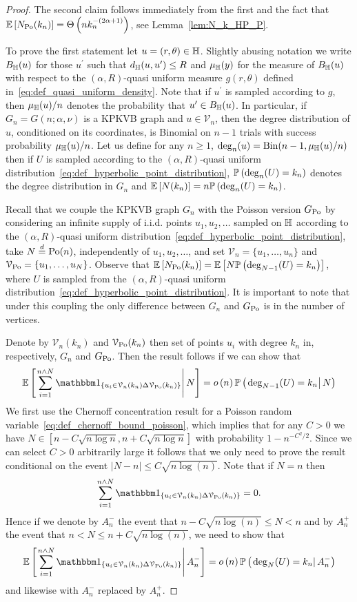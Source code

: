 \begin{proof}
The second claim follows immediately from the first and the fact that $\mathbb{E}\left[N_{{\mathrm{Po}}}(k_n)\right] = \Theta\left(n k_n^{-(2\alpha + 1)}\right)$, see Lemma~\ref{lem:N_k_HP_P}.

To prove the first statement let $u = (r,\theta) \in \mathbb{H}$. Slightly abusing notation we write $B_{\mathbb{H}}(u)$ for those $u^\prime$ such that $d_{\mathbb{H}}(u,u^\prime) \le R$ and $\mu_{\mathbb{H}}(y)$ for the measure of $B_{\mathbb{H}}(u)$ with respect to the $(\alpha, R)$-quasi uniform measure $g(r,\theta)$ defined in~\eqref{eq:def_quasi_uniform_density}. Note that if $u^\prime$ is sampled according to $g$, then $\mu_{\mathbb{H}}(u)/n$ denotes the probability that $u^\prime \in B_{\mathbb{H}}(u)$. In particular, if $G_n = G(n; \alpha, \nu)$ is a KPKVB graph and $u \in \mathcal{V}_n$, then the degree distribution of $u$, conditioned on its coordinates, is Binomial on $n-1$ trials with success probability $\mu_{\mathbb{H}}(u)/n$. Let us define for any $n \ge 1$, $\mathrm{deg}_n(u) = \mathrm{Bin}(n-1, \mu_{\mathbb{H}}(u)/n)$ then if $U$ is sampled according to the  $(\alpha, R)$-quasi uniform distribution~\eqref{eq:def_hyperbolic_point_distribution}, $\mathbb{P}\left(\mathrm{deg}_n(U) = k_n\right)$ denotes the degree distribution in $G_n$ and $\mathbb{E}\left[N(k_n)\right] = n \mathbb{P}\left(\mathrm{deg}_n(U) = k_n\right)$. 

Recall that we couple the KPKVB graph $G_n$ with the Poisson version $G_{\text{Po}}$ by considering an infinite supply of i.i.d. points $u_1, u_2, \dots$ sampled on $\mathbb{H}$ according to the $(\alpha, R)$-quasi uniform distribution~\eqref{eq:def_hyperbolic_point_distribution}, take $N \stackrel{d}{=} {\mathrm{Po}}(n)$, independently of $u_1, u_2, \dots$, and set $\mathcal{V}_n =\{u_1, \dots, u_n\}$ and $\mathcal{V}_{{\mathrm{Po}}} = \{u_1, \dots, u_N\}$. Observe that $\mathbb{E}\left[N_{{\mathrm{Po}}}(k_n)\right] = \mathbb{E}\left[N \mathbb{P}\left(\mathrm{deg}_{N-1}(U) = k_n\right)\right]$, where $U$ is sampled from the $(\alpha, R)$-quasi uniform distribution~\eqref{eq:def_hyperbolic_point_distribution}. It is important to note that under this coupling the only difference between $G_n$ and $G_{\text{Po}}$ is in the number of vertices.

Denote by $\mathcal{V}_n(k_n)$ and $\mathcal{V}_{{\mathrm{Po}}}(k_n)$ then set of points $u_i$ with degree $k_n$ in, respectively, $G_n$ and $G_{\text{Po}}$. Then the result follows if we can show that
\[
	\CExp{\sum_{i = 1}^{n \wedge N} \ind{u_i \in \mathcal{V}_n(k_n) \Delta \VPo(k_n)}}{N} 
	= \smallO{n}\CProb{\deg_{N-1}(U) = k_n}{N}
\]
We first use the Chernoff concentration result for a Poisson random variable~\eqref{eq:def_chernoff_bound_poisson}, which implies that for any $C>0$ we have $N \in [n-C\sqrt{n\log n},n+C\sqrt{n \log n}]$ with probability $1-n^{-C^2/2}$. Since we can select $C > 0$ arbitrarily large it follows that we only need to prove the result conditional on the event $|N-n|\le C\sqrt{n \log(n)}$. Note that if $N = n$ then 
\[
	\sum_{i = 1}^{n \wedge N} \ind{u_i \in \mathcal{V}_n(k_n) \Delta \VPo(k_n)} = 0.
\]
Hence if we denote by $A_n^-$ the event that $n - C\sqrt{n \log(n)} \le N < n$ and by $A_n^+$ the event that $n < N \le n + C\sqrt{n \log(n)}$, we need to show that
\[
	\CExp{\sum_{i = 1}^{n \wedge N} \ind{u_i \in \mathcal{V}_n(k_n) \Delta \VPo(k_n)}}{A_n^-} 
		= \smallO{n}\CProb{\deg_N(U) = k_n}{A_n^-}
\]
and likewise with $A_n^-$ replaced by $A_n^+$.


\end{proof}
